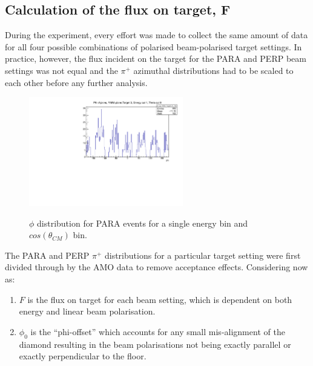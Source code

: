 \subsection{Calculation of the flux on target, F}
During the experiment, every effort was made to collect the same amount of data for all four possible combinations of polarised beam-polarised target settings. In practice, however, the flux incident on the target for the PARA and PERP beam settings was not equal and the $\pi^+$ azimuthal distributions had to be scaled to each other before any further analysis.
\begin{figure}[htb]
  \begin{center}
    \includegraphics[width=0.6\textwidth]{figures/phi_PARA.pdf} \\
    \caption{$\phi$ distribution for PARA events for a single energy bin and $cos(\theta_{CM})$ bin. }
    \label{fig:frost_PARA_ex}
  \end{center}
\end{figure}



The PARA and PERP $\pi^+$ distributions for a particular target setting were first divided through by the AMO data to remove acceptance effects.
Considering now as:
\begin{enumerate}
  \item $F$ is the flux on target for each beam setting, which is dependent on both energy and linear beam polarisation. 
  \item $\phi_0$ is the “phi-offset” which accounts for any small mis-alignment of the diamond resulting in the beam polarisations not being exactly parallel or exactly perpendicular to the floor.
\end{enumerate}

